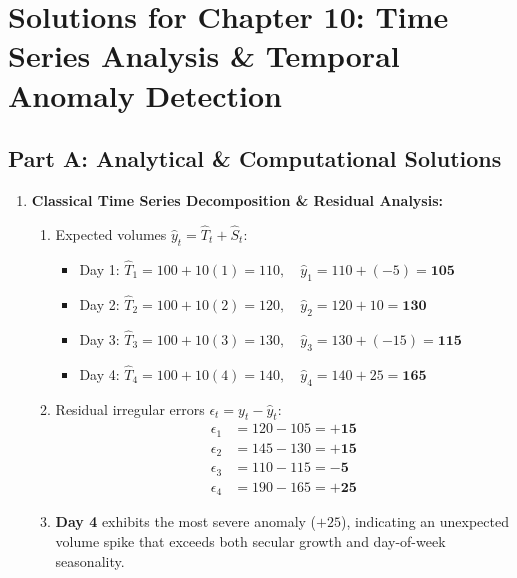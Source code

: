 \newpage
\section*{Solutions for Chapter 10: Time Series Analysis \& Temporal Anomaly Detection}

\subsection*{Part A: Analytical \& Computational Solutions}

\begin{enumerate}[label=\textbf{P10.\arabic*}]
    \item \textbf{Classical Time Series Decomposition \& Residual Analysis:}
    \begin{enumerate}[label=(\alph*)]
        \item Expected volumes $\hat{y}_t = \hat{T}_t + \hat{S}_t$:
        \begin{itemize}
            \item Day 1: $\hat{T}_1 = 100 + 10(1) = 110, \quad \hat{y}_1 = 110 + (-5) = \mathbf{105}$
            \item Day 2: $\hat{T}_2 = 100 + 10(2) = 120, \quad \hat{y}_2 = 120 + 10 = \mathbf{130}$
            \item Day 3: $\hat{T}_3 = 100 + 10(3) = 130, \quad \hat{y}_3 = 130 + (-15) = \mathbf{115}$
            \item Day 4: $\hat{T}_4 = 100 + 10(4) = 140, \quad \hat{y}_4 = 140 + 25 = \mathbf{165}$
        \end{itemize}
        \item Residual irregular errors $\epsilon_t = y_t - \hat{y}_t$:
        \begin{align*}
        \epsilon_1 &= 120 - 105 = \mathbf{+15} \\
        \epsilon_2 &= 145 - 130 = \mathbf{+15} \\
        \epsilon_3 &= 110 - 115 = \mathbf{-5} \\
        \epsilon_4 &= 190 - 165 = \mathbf{+25}
        \end{align*}
        \item \textbf{Day 4} exhibits the most severe anomaly ($+25$), indicating an unexpected volume spike that exceeds both secular growth and day-of-week seasonality.
    \end{enumerate}


\end{enumerate}

